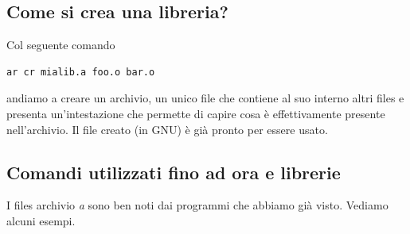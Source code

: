 \documentclass[11pt]{report}
\theoremstyle{definition}
\begin{document}
\subsection{Come si crea una libreria?} Col seguente comando
\begin{verbatim}
ar cr mialib.a foo.o bar.o
\end{verbatim}
andiamo a creare un archivio, un unico file che contiene al suo interno altri files e presenta un'intestazione che permette di capire cosa è effettivamente presente nell'archivio. Il file creato (in GNU) è già pronto per essere usato.
\clearpage
\subsection{Comandi utilizzati fino ad ora e librerie}
I files archivio \emph{a} sono ben noti dai programmi che abbiamo già visto. Vediamo alcuni esempi.
\end{document}
